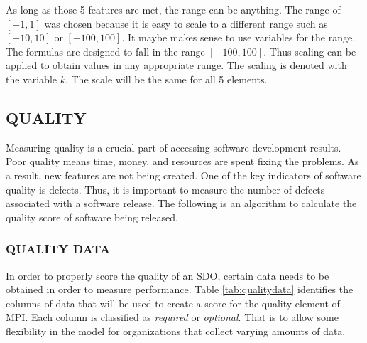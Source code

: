 \documentclass[SDSUThesis.tex]{subfiles}
\begin{document}
    As long as those 5 features are met, the range can be anything.  
    The range of $[-1,1]$ was chosen because it is easy to scale 
    to a different range such as $[-10,10]$ or $[-100,100]$.  
    It maybe makes sense to use variables for the range.  
    The formulas are designed to fall in the range $[-100,100]$.  
    Thus scaling can be applied to obtain values in any appropriate range. 
    The scaling is denoted with the variable $k$.  The scale will be the same
    for all 5 elements.
        
\subsection{QUALITY}
    Measuring quality is a crucial part of accessing 
    software development results.  
    Poor quality means time, money, and resources are spent 
    fixing the problems. As a result, new features are not being
    created. One of the key indicators of software quality 
    is defects.  Thus, it is important
    to measure the number of defects associated with a software 
    release.  The following is an algorithm to calculate
    the quality score of software being released. 
    
    \subsubsection{QUALITY DATA}
        In order to properly score the quality of an SDO,
        certain data needs to be obtained in order to measure
        performance. Table \ref{tab:qualitydata} identifies
        the columns of data that will be used to create
        a score for the quality element of MPI.  
        Each column is classified as \textit{required} or
        \textit{optional}.  That is to allow some flexibility
        in the model for organizations that collect
        varying amounts of data.
        
\end{document}
